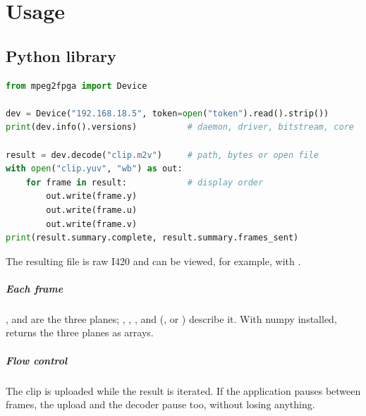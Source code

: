 \chapter{Usage}

\section{Python library}

\begin{lstlisting}[language=Python]
from mpeg2fpga import Device

dev = Device("192.168.18.5", token=open("token").read().strip())
print(dev.info().versions)          # daemon, driver, bitstream, core

result = dev.decode("clip.m2v")     # path, bytes or open file
with open("clip.yuv", "wb") as out:
    for frame in result:            # display order
        out.write(frame.y)
        out.write(frame.u)
        out.write(frame.v)
print(result.summary.complete, result.summary.frames_sent)
\end{lstlisting}

The resulting file is raw I420 and can be viewed, for example, with
.

\paragraph{Each frame} ,  and  are the
three planes; , ,
,  and
 (,  or ) describe it.
With numpy installed,  returns the three planes as
arrays.

\paragraph{Flow control} The clip is uploaded while the result is iterated.
If the application pauses between frames, the upload and the decoder pause
too, without losing anything.

